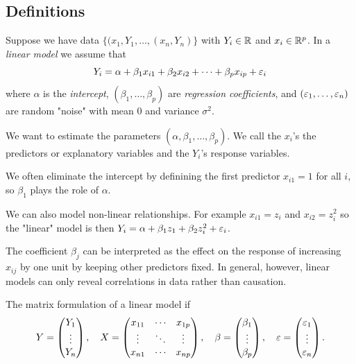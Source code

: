 \documentclass{article}
\begin{document}
\subsection{Definitions}
Suppose we have data $ \{(x_1,Y_1,\dots, (x_n,Y_n)\} $ with $ Y_i\in \mathbb{R} $ and $ x_i\in \mathbb{R}^p $. In a \textit{linear model} we assume that 
\[
	Y_i = \alpha + \beta_1 x_{i1} + \beta_2 x_{i2}+\dots +\beta_p x_{ip} + \varepsilon_i
\]
where $ \alpha $ is the \textit{intercept}, $ (\beta_1,\dots, \beta_p) $ are \textit{regression coefficients}, and $ (\varepsilon_1,\dots, \varepsilon_n) $ are random "noise" with mean $ 0 $ and variance $ \sigma^2 $.\par
We want to estimate the parameters $ (\alpha,\beta_1,\dots, \beta_p) $. We call the $ x_i $'s the predictors or explanatory variables and the $ Y_i $'s response variables.
\begin{remark}
	We often eliminate the intercept by definining the first predictor $ x_{i1}=1 $ for all $ i $, so $ \beta_1 $ plays the role of $ \alpha $.
\end{remark}
\begin{remark}
	We can also model non-linear relationships. For example $ x_{i1} = z_i $ and $ x_{i2}= z_i^2 $ so the "linear" model is then $ Y_i = \alpha + \beta_1z_1+\beta_2z_i^2+\varepsilon_i $.
\end{remark}
\begin{remark}
The coefficient $ \beta_j $ can be interpreted as the effect on the response of increasing $ x_{ij} $ by one unit by keeping other predictors fixed. In general, however, linear models can only reveal correlations in data rather than causation.
\end{remark}
The matrix formulation of a linear model if
\[
  Y=\begin{pmatrix}
    Y_1 \\
    \vdots \\
    Y_n
  \end{pmatrix},\quad X=\begin{pmatrix}
  x_{11} & \cdots & x_{1p} \\
  \vdots & \ddots & \vdots \\
  x_{n1} & \cdots & x_{np}
  \end{pmatrix},\quad \beta = \begin{pmatrix}
    \beta_1 \\
    \vdots \\
    \beta_p
  \end{pmatrix},\quad \varepsilon = \begin{pmatrix}
    \varepsilon_1 \\
    \vdots \\
    \varepsilon_n
  \end{pmatrix}.
\]
\end{document}

